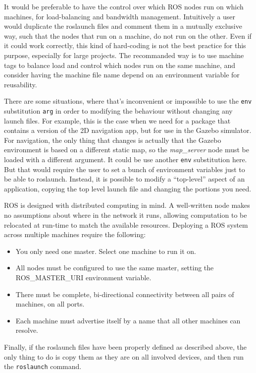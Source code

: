 It would be preferable to have the control over which ROS nodes run on which machines, for load-balancing and bandwidth management.
Intuitively a user would duplicate the roslaunch files and comment them in a mutually exclusive way, such that the nodes that run on a machine, do not run on the other. Even if it could work correctly, this kind of hard-coding is not the best practice for this purpose, especially for large projects. The recommanded way is to use machine tags to balance load and control which nodes run on the same machine, and consider having the machine file name depend on an environment variable for reusability.

There are some situations, where that's inconvenient or impossible to use the \texttt{env} substitution \texttt{arg} in order to modifying the behaviour without changing any launch files. For example, this is the case when we need for a package that contains a version of the 2D navigation app, but for use in the Gazebo simulator.
For navigation, the only thing that changes is actually that the Gazebo environment is based on a different static map, so the \textit{map\_server} node must be loaded with a different argument. It could be use another \texttt{env} substitution here. But that would require the user to set a bunch of environment variables just to be able to roslaunch. 
Instead, it is possible to modify a ``top-level'' aspect of an application, copying the top level launch file and changing the portions you need. 


ROS is designed with distributed computing in mind. A well-written node makes no assumptions about where in the network it runs, allowing computation to be relocated at run-time to match the available resources. Deploying a ROS system across multiple machines require the following:

\begin{itemize}
	\item You only need one master. Select one machine to run it on.
	\item All nodes must be configured to use the same master, setting the ROS\_MASTER\_URI environment variable.
	\item There must be complete, bi-directional connectivity between all pairs of machines, on all ports.
	\item Each machine must advertise itself by a name that all other machines can resolve.
\end{itemize}  

Finally, if the roslaunch files have been properly defined as described above, the only thing to do is copy them as they are on all involved devices, and then run the \texttt{roslaunch} command.


